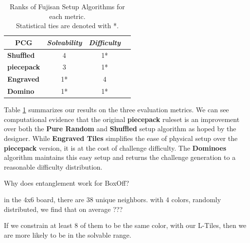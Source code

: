 \documentclass[journal]{IEEEtran}
\begin{document}
\begin{table}[]
\centering
\renewcommand{\arraystretch}{1.3}
\caption{Ranks of Fujisan Setup Algorithms for each metric.\\ Statistical ties are denoted with *.}
\label{table_example}
\begin{tabular}{l|c|c|c|}
\multicolumn{1}{c|}{\textbf{PCG}} & \multicolumn{1}{l|}{\textit{\textbf{Solvability}}} & \multicolumn{1}{l|}{\textit{\textbf{Difficulty}}} \\ \hline
\textbf{Shuffled}                 & 4                                                  & 1*                                                 \\ \hline
\textbf{piecepack}                & 3                                                  & 1*                                                 \\ \hline
\textbf{Engraved}                 & 1*                                                  & 4                                                 \\ \hline
\textbf{Domino}                   & 1*                                                  & 1*                                                 \\ \hline
\end{tabular}
\end{table}

Table \ref{table_example} summarizes our results on the three evaluation metrics. We can see computational evidence that the original {\bf piecepack} ruleset is an improvement over both the {\bf Pure Random} and {\bf Shuffled} setup algorithm as hoped by the designer. While {\bf Engraved Tiles} simplifies the ease of physical setup over the {\bf piecepack} version, it is at the cost of challenge difficulty. The {\bf Dominoes} algorithm maintains this easy setup and returns the challenge generation to a reasonable difficulty distribution.


Why does entanglement work for BoxOff?

in the 4x6 board, there are 38 unique neighbors. with 4 colors, randomly distributed, we find that on average ???

If we constrain at least 8 of them to be the same color, with our L-Tiles, then we are more likely to be in the solvable range.
\end{document}
